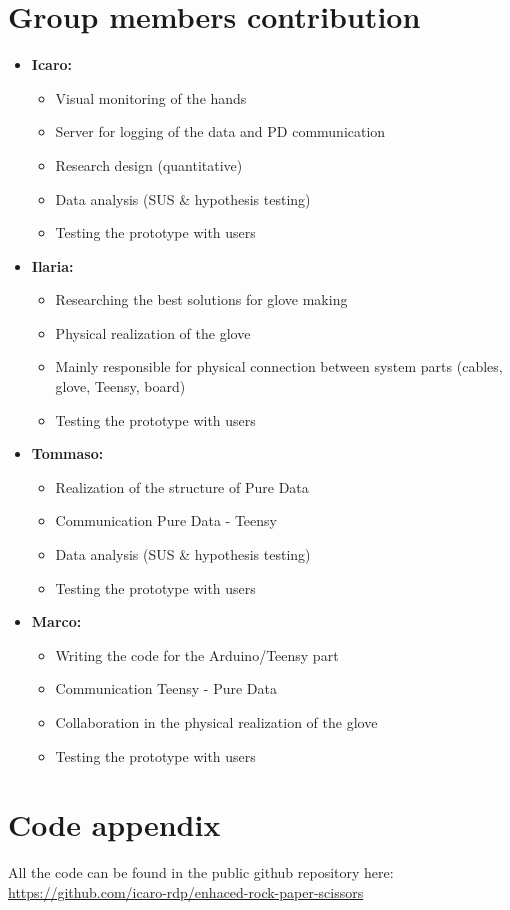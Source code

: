 \documentclass[11pt,a4paper]{report}
\begin{document}
\section*{Group members contribution}
\begin{itemize}
\item \textbf{Icaro:}
  \begin{itemize}
  \item Visual monitoring of the hands
  \item Server for logging of the data and PD communication
  \item Research design (quantitative)
  \item Data analysis (SUS \& hypothesis testing)
  \item Testing the prototype with users
  \end{itemize}

\item \textbf{Ilaria:}
  \begin{itemize}
  \item Researching the best solutions for glove making
  \item Physical realization of the glove
  \item Mainly responsible for physical connection between system parts (cables, glove, Teensy, board)
  \item Testing the prototype with users
  \end{itemize}

\item \textbf{Tommaso:}
  \begin{itemize}
  \item Realization of the structure of Pure Data
  \item Communication Pure Data - Teensy
  \item Data analysis (SUS \& hypothesis testing)
  \item Testing the prototype with users
  \end{itemize}

\item \textbf{Marco:}
  \begin{itemize}
  \item Writing the code for the Arduino/Teensy part
  \item Communication Teensy - Pure Data
  \item Collaboration in the physical realization of the glove
  \item Testing the prototype with users
  \end{itemize}
\end{itemize}

\section*{Code appendix}
All the code can be found in the public github repository here: \url{https://github.com/icaro-rdp/enhaced-rock-paper-scissors }

\newpage
\printbibliography
{}
\end{document}
